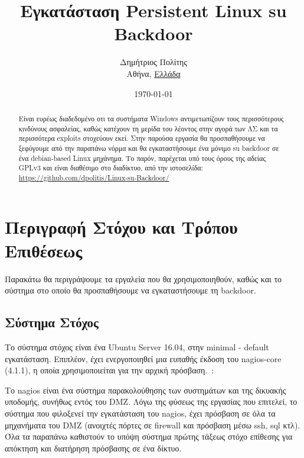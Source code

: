 \documentclass[12pt]{report}
\begin{document}

\title{Εγκατάσταση \textlatin{Persistent Linux su Backdoor}}
\author{
        Δημήτριος Πολίτης\\
        Αθήνα, \underline{Ελλάδα}
}
\date{\today}

\hypersetup{pageanchor=false}

\maketitle

\tableofcontents

\begin{abstract}
Είναι ευρέως διαδεδομένο οτι τα συστήματα \textlatin{Windows} αντιμετωπίζουν τους περισσότερους κινδύνους ασφαλείας, καθώς κατέχουν τη μερίδα του λέοντος στην αγορά των ΛΣ και τα περισσότερα \textlatin{exploits} στοχεύουν εκεί. Στην παρούσα εργασία θα προσπαθήσουμε να ξεφύγουμε από την παραπάνω νόρμα και θα εγκαταστήσουμε ένα μόνιμο \textlatin{su backdoor} σε ένα \textlatin{debian-based Linux} μηχάνημα. Το παρόν, παρέχεται υπό τους όρους της αδείας \textlatin{GPLv3} και είναι διαθέσιμο στο διαδίκτυο, από την ιστοσελίδα: \textlatin{\url{https://github.com/dpolitis/Linux-su-Backdoor/}}
\end{abstract}

\chapter{Περιγραφή Στόχου και Τρόπου Επιθέσεως}
\hypersetup{pageanchor=true}

Παρακάτω θα περιγράψουμε τα εργαλεία που θα χρησιμοποιηθούν, καθώς και το σύστημα στο οποίο θα προσπαθήσουμε να εγκαταστήσουμε τη \textlatin{backdoor}.

\section{Σύστημα Στόχος}
Το σύστημα στόχος είναι ένα \textlatin{Ubuntu Server 16.04}, στην \textlatin{minimal - default} εγκατάσταση. Επιπλέον, έχει ενεργοποιηθεί μια ευπαθής έκδοση του \textlatin{nagios-core (4.1.1)}, η οποία χρησιμοποιείται για την αρχική πρόσβαση.~\cite{exploit:01}:

Το \textlatin{nagios} είναι ένα σύστημα παρακολούθησης των συστημάτων και της δικυακής υποδομής, συνήθως εντός του \textlatin{DMZ}. Λόγω της φύσεως της εργασίας που επιτελεί, το σύστημα που φιλοξενεί την εγκατάσταση του \textlatin{nagios}, έχει πρόσβαση σε όλα τα μηχανήματα του \textlatin{DMZ} (ανοιχτές πόρτες σε \textlatin{firewall} και πρόσβαση μέσω \textlatin{ssh, sql} κτλ). Όλα τα παραπάνω καθιστούν το υπόψη σύστημα πρώτης τάξεως στόχο επίθεσης για απόκτηση και διατήρηση πρόσβασης σε ένα δίκτυο.
\end{document}
